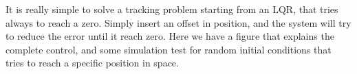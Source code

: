 It is really simple to solve a tracking problem starting from an LQR, that tries always to reach a zero. Simply insert an offset in position, and the system will try to reduce the error until it reach zero. Here we have a figure that explains the complete control, and some simulation test for random initial conditions that tries to reach a specific position in space.

